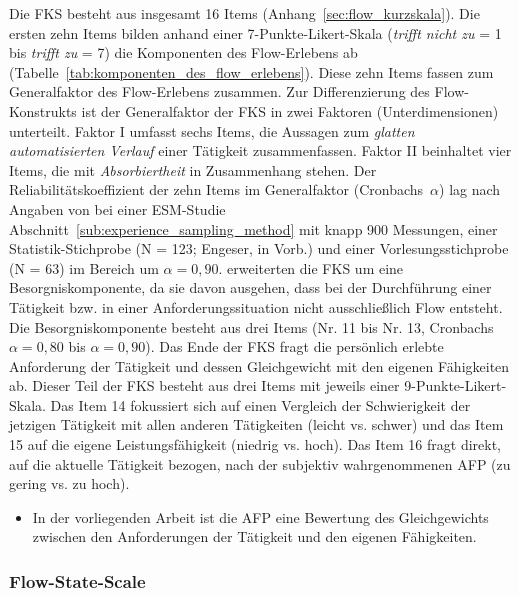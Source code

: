 Die \ac{FKS} besteht aus insgesamt 16 Items (Anhang~\ref{sec:flow_kurzskala}). Die ersten zehn Items bilden anhand einer 7-Punkte-Likert-Skala (\emph{trifft nicht zu} = 1 bis \emph{trifft zu} = 7) die Komponenten des Flow-Erlebens ab (Tabelle~\ref{tab:komponenten_des_flow_erlebens}). Diese zehn Items fassen \citet{Rheinberg2003} zum Generalfaktor des Flow-Erlebens zusammen. Zur Differenzierung des Flow-Konstrukts ist der Generalfaktor der \ac{FKS} in zwei Faktoren (Unterdimensionen) unterteilt. Faktor I umfasst sechs Items, die Aussagen zum \emph{glatten automatisierten Verlauf} einer Tätigkeit zusammenfassen. Faktor II beinhaltet vier Items, die mit \emph{Absorbiertheit} in Zusammenhang stehen. Der Reliabilitätskoeffizient der zehn Items im Generalfaktor (Cronbachs~$\alpha$) lag nach Angaben von \citet[S.~9]{Rheinberg2003} bei einer \ac{ESM}-Studie Abschnitt~\ref{sub:experience_sampling_method} mit knapp 900 Messungen, einer Statistik-Stichprobe (N = 123; Engeser, in Vorb.) und einer Vorlesungsstichprobe (N = 63) im Bereich um $\alpha = 0{,}90$. \citet{Rheinberg2003} erweiterten die \ac{FKS} um eine Besorgniskomponente, da sie davon ausgehen, dass bei der Durchführung einer Tätigkeit bzw. in einer Anforderungssituation nicht ausschließlich Flow entsteht. Die Besorgniskomponente besteht aus drei Items (Nr. 11 bis Nr. 13, Cronbachs $\alpha = 0{,}80$ bis $\alpha = 0{,}90$). Das Ende der \ac{FKS} fragt die persönlich erlebte Anforderung der Tätigkeit und dessen Gleichgewicht mit den eigenen Fähigkeiten ab. Dieser Teil der \ac{FKS} besteht aus drei Items mit jeweils einer 9-Punkte-Likert-Skala. Das Item 14 fokussiert sich auf einen Vergleich der Schwierigkeit der jetzigen Tätigkeit mit allen anderen Tätigkeiten (leicht vs. schwer) und das Item 15 auf die eigene Leistungsfähigkeit (niedrig vs. hoch). Das Item 16 fragt direkt, auf die aktuelle Tätigkeit bezogen, nach der subjektiv wahrgenommenen \ac{AFP} (zu gering vs. zu hoch). 

\begin{itemize}

	\item In der vorliegenden Arbeit ist die \ac{AFP} eine Bewertung des Gleichgewichts zwischen den Anforderungen der Tätigkeit und den eigenen Fähigkeiten.

\end{itemize}



\subsubsection{Flow-State-Scale} %
\label{ssub:flow_state_scale}

